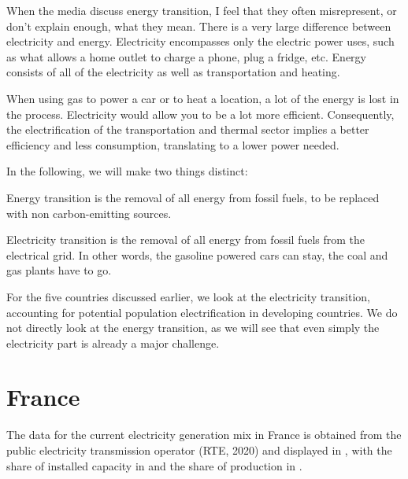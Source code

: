 When the media discuss energy transition, I feel that they often misrepresent, or don't explain enough, what they mean. There is a very large difference between electricity and energy. Electricity encompasses only the electric power uses, such as what allows a home outlet to charge a phone, plug a fridge, etc. Energy consists of all of the electricity as well as transportation and heating.

When using gas to power a car or to heat a location, a lot of the energy is lost in the process. Electricity would allow you to be a lot more efficient. Consequently, the electrification of the transportation and thermal sector implies a better efficiency and less consumption, translating to a lower power needed.

In the following, we will make two things distinct:

\begin{kaobox}[frametitle=Energy Transition]
Energy transition is the removal of all energy from fossil fuels, to be replaced with non carbon-emitting sources.
\end{kaobox}

\begin{kaobox}[frametitle=Electricity Transition]
Electricity transition is the removal of all energy from fossil fuels from the electrical grid. In other words, the gasoline powered cars can stay, the coal and gas plants have to go.
\end{kaobox}


For the five countries discussed earlier, we look at the electricity transition, accounting for potential population electrification in developing countries. We do not directly look at the energy transition, as we will see that even simply the electricity part is already a major challenge.


\section{France}

The data for the current electricity generation mix in France is obtained from the public electricity transmission operator (RTE, 2020) and displayed in , with the share of installed capacity in  and the share of production in .

